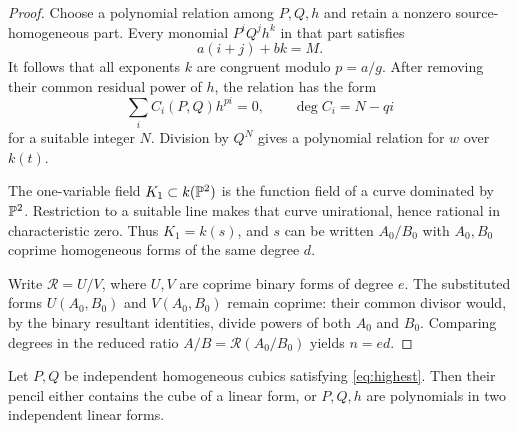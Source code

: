 \documentclass[11pt,reqno]{amsart}
\begin{document}
\begin{proof}
Choose a polynomial relation among \(P,Q,h\) and retain a nonzero
source-homogeneous part.  Every monomial \(P^iQ^jh^k\) in that part
satisfies
\[
a(i+j)+bk=M.
\]
It follows that all exponents \(k\) are congruent modulo \(p=a/g\).
After removing their common residual power of \(h\), the relation has the
form
\[
\sum_i C_i(P,Q)h^{pi}=0,
\qquad \deg C_i=N-qi
\]
for a suitable integer \(N\).  Division by \(Q^N\) gives a polynomial
relation for \(w\) over \(k(t)\).

The one-variable field \(K_1\subset k(\mathbb P^2)\) is the function field of a
curve dominated by \(\mathbb P^2\).  Restriction to a suitable line makes that
curve unirational, hence rational in characteristic zero.  Thus
\(K_1=k(s)\), and \(s\) can be written \(A_0/B_0\) with \(A_0,B_0\)
coprime homogeneous forms of the same degree \(d\).

Write \(\mathcal R=U/V\), where \(U,V\) are coprime binary forms of degree
\(e\).  The substituted forms \(U(A_0,B_0)\) and \(V(A_0,B_0)\) remain
coprime: their common divisor would, by the binary resultant identities,
divide powers of both \(A_0\) and \(B_0\).  Comparing degrees in the reduced
ratio \(A/B=\mathcal R(A_0/B_0)\) yields \(n=ed\).
\end{proof}

\begin{proposition}
\label{prop:cubic-pencils}
Let \(P,Q\) be independent homogeneous cubics satisfying
\eqref{eq:highest}.  Then their pencil either contains the cube of a linear
form, or \(P,Q,h\) are polynomials in two independent linear forms.
\end{proposition}
\end{document}
